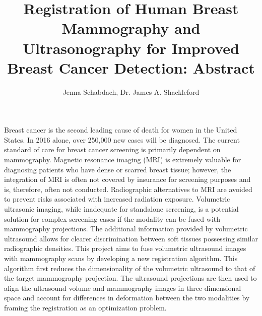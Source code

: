 \documentclass[12pt]{article}
\begin{document}
\title{Registration of Human Breast Mammography and Ultrasonography for Improved Breast Cancer Detection: Abstract}
\author{Jenna Schabdach, Dr. James A. Shackleford}
\maketitle

Breast cancer is the second leading cause of death for women in the United States. In 2016 alone, over 250,000 new cases will be diagnosed. The current standard of care for breast cancer screening is primarily dependent on mammography. Magnetic resonance imaging (MRI) is extremely valuable for diagnosing patients who have dense or scarred breast tissue; however, the integration of MRI is often not covered by insurance for screening purposes and is, therefore, often not conducted. Radiographic alternatives to MRI are avoided to prevent risks associated with increased radiation exposure. Volumetric ultrasonic imaging, while inadequate for standalone screening, is a potential solution for complex screening cases if the modality can be fused with mammography projections. The additional information provided by volumetric ultrasound allows for clearer discrimination between soft tissues possessing similar radiographic densities. This project aims to fuse volumetric ultrasound images with mammography scans by developing a new registration algorithm. This algorithm first reduces the dimensionality of the volumetric ultrasound to that of the target mammography projection. The ultrasound projections are then used to align the ultrasound volume and mammography images in three dimensional space and account for differences in deformation between the two modalities by framing the registration as an optimization problem.
\end{document}
